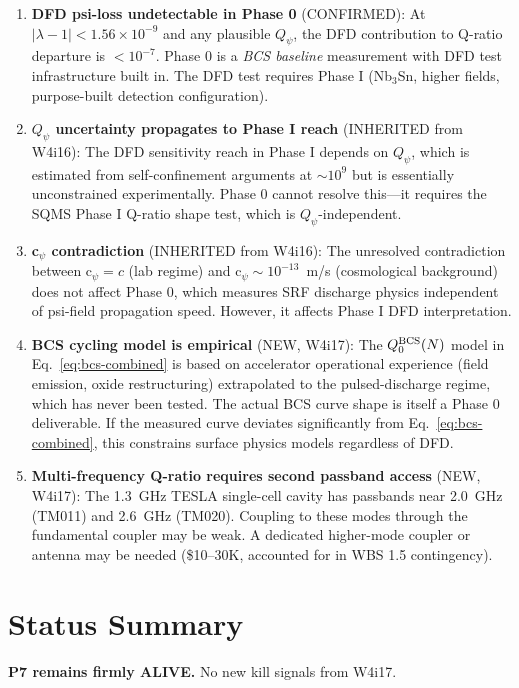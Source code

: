 \documentclass[11pt]{article}
\newcommand{\ee}[1]{\times 10^{#1}}
\newcommand{\Qpsi}{Q_\psi}
\newcommand{\Qzero}{Q_0}
\begin{document}
\begin{enumerate}
  \item \textbf{DFD psi-loss undetectable in Phase 0} (CONFIRMED):
    At $|\lambda-1| < 1.56\ee{-9}$ and any plausible $\Qpsi$, the
    DFD contribution to Q-ratio departure is $< 10^{-7}$.
    Phase 0 is a \emph{BCS baseline} measurement with DFD test
    infrastructure built in. The DFD test requires Phase I
    (Nb$_3$Sn, higher fields, purpose-built detection configuration).
  \item \textbf{$\Qpsi$ uncertainty propagates to Phase I reach}
    (INHERITED from W4i16): The DFD sensitivity reach in Phase I
    depends on $\Qpsi$, which is estimated from self-confinement
    arguments at $\sim 10^9$ but is essentially unconstrained
    experimentally. Phase 0 cannot resolve this---it requires the
    SQMS Phase I Q-ratio shape test, which is $\Qpsi$-independent.
  \item \textbf{c$_\psi$ contradiction} (INHERITED from W4i16):
    The unresolved contradiction between c$_\psi = c$ (lab regime)
    and c$_\psi \sim 10^{-13}$~m/s (cosmological background) does
    not affect Phase 0, which measures SRF discharge physics
    independent of psi-field propagation speed. However, it affects
    Phase I DFD interpretation.
  \item \textbf{BCS cycling model is empirical} (NEW, W4i17): The
    $\Qzero^{\rm BCS}(N)$ model in Eq.~\eqref{eq:bcs-combined} is
    based on accelerator operational experience (field emission,
    oxide restructuring) extrapolated to the pulsed-discharge regime,
    which has never been tested. The actual BCS curve shape is itself
    a Phase 0 deliverable. If the measured curve deviates
    significantly from Eq.~\eqref{eq:bcs-combined}, this constrains
    surface physics models regardless of DFD.
  \item \textbf{Multi-frequency Q-ratio requires second passband
    access} (NEW, W4i17): The 1.3~GHz TESLA single-cell cavity has
    passbands near 2.0~GHz (TM011) and 2.6~GHz (TM020). Coupling
    to these modes through the fundamental coupler may be weak.
    A dedicated higher-mode coupler or antenna may be needed
    (\$10--30K, accounted for in WBS 1.5 contingency).
\end{enumerate}

\section{Status Summary}

\textbf{P7 remains firmly ALIVE.} No new kill signals from W4i17.
\end{document}
